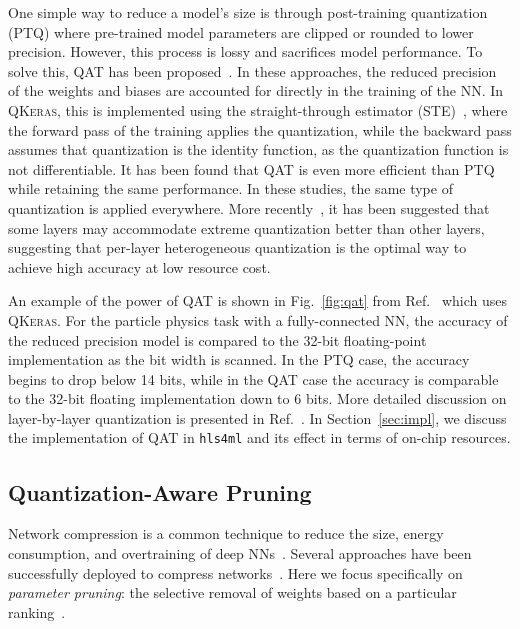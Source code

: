 \documentclass[sigconf]{acmart}
\newcommand{\hlsfml}{\texttt{hls4ml}\xspace}
\begin{document}
One simple way to reduce a model's size is through post-training quantization (PTQ) where pre-trained model parameters are clipped or rounded to lower precision. 
However, this process is lossy and sacrifices model performance. 
To solve this, QAT has been proposed~\cite{bertmoons,binary_first,ternary-16}.
In these approaches, the reduced precision of the weights and biases are accounted for directly in the training of the NN.  
In \textsc{QKeras}, this is implemented using the straight-through estimator (STE)~\cite{NIPS2015_5647}, where the forward pass of the training applies the quantization, while the backward pass assumes that quantization is the identity function, as the quantization function is not differentiable.
It has been found that QAT is even more efficient than PTQ while retaining the same performance. 
In these studies, the same type of quantization is applied everywhere. 
More recently~\cite{haq,hawq}, it has been suggested that some layers may accommodate extreme quantization better than other layers, suggesting that per-layer heterogeneous quantization is the optimal way to achieve high accuracy at low resource cost. 

An example of the power of QAT is shown in Fig.~\ref{fig:qat} from Ref.~\cite{Coelho:2020zfu} which uses \textsc{QKeras}.  
For the particle physics task with a fully-connected NN, the accuracy of the reduced precision model is compared to the 32-bit floating-point implementation as the bit width is scanned.
In the PTQ case, the accuracy begins to drop below 14 bits, while in the QAT case the accuracy is comparable to the 32-bit floating implementation down to 6 bits. 
More detailed discussion on layer-by-layer quantization is presented in Ref.~\cite{Coelho:2020zfu}.
In Section~\ref{sec:impl}, we discuss the implementation of QAT in \hlsfml and its effect in terms of on-chip resources.

\subsection{Quantization-Aware Pruning}
\label{sec:qap}
Network compression is a common technique to reduce the size, energy consumption, and overtraining of deep NNs~\cite{DBLP:journals/corr/HanMD15}. 
Several approaches have been successfully deployed to compress networks~\cite{DBLP:journals/corr/abs-1710-09282,9043731,review2020}.
Here we focus specifically on \textit{parameter pruning}: the selective removal of weights based on a particular ranking~\cite{NIPS1989_250,2017arXiv171201312L,DBLP:journals/corr/HanMD15,lotteryticket,learningraterewinding,stateofpruning}. 
\end{document}
